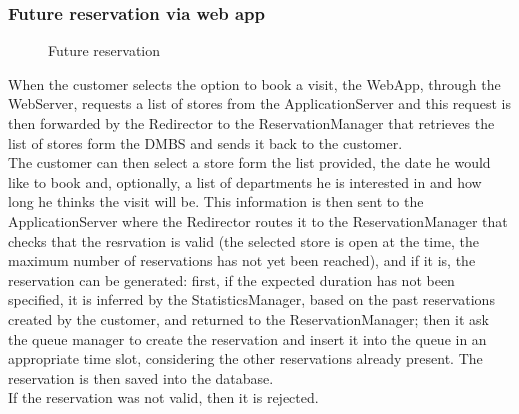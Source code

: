 \subsubsection{Future reservation via web app}
\begin{figure}[H]
	\noindent
	\caption{Future reservation} 
\end{figure}
When the customer selects the option to book a visit, the WebApp, through the WebServer, requests a list of stores from the ApplicationServer and this request is then forwarded by the Redirector to the ReservationManager that retrieves the list of stores form the DMBS and sends it back to the customer.\\
The customer can then select a store form the list provided, the date he would like to book and, optionally, a list of departments he is interested in and how long he thinks the visit will be. This information is then sent to the ApplicationServer where the Redirector routes it to the ReservationManager that checks that the resrvation is valid (the selected store is open at the time, the maximum number of reservations has not yet been reached), and if it is, the reservation can be generated: first, if the expected duration has not been specified, it is inferred by the StatisticsManager, based on the past reservations created by the customer, and returned to the ReservationManager; then it ask the queue manager to create the reservation and insert it into the queue in an appropriate time slot, considering the other reservations already present. The reservation is then saved into the database.\\
If the reservation was not valid, then it is rejected.
